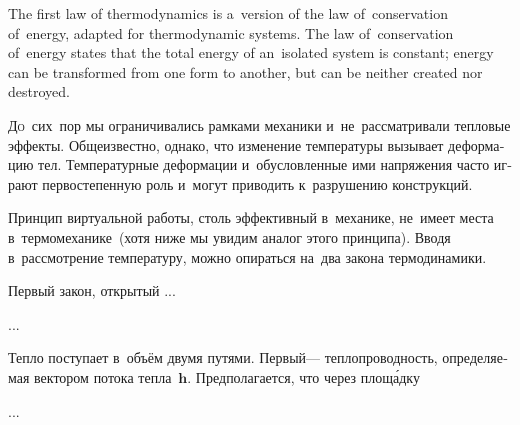 

\thispagestyle{empty}

\label{chapter:thermoelasticity}



\begin{otherlanguage}{russian}

{\small
The first law of thermodynamics is a~version of the law of~conservation of~energy, adapted for thermodynamic systems. The law of~conservation of~energy states that the total energy of an~isolated system is constant; energy can be transformed from one form to another, but can be neither created nor destroyed.
\par}

\lettrine[lines=2, findent=2pt, nindent=0pt]{Д}{о}~сих~пор мы ограничивались рамками механики и~не~рассматривали тепловые эффекты. Общеизвестно, однако, что изменение температуры вызывает деформацию тел. Температурные деформации и~обусловленные ими напряжения часто играют первостепенную роль и~могут приводить к~разрушению конструкций.

Принцип виртуальной работы, столь эффективный в~механике, не~имеет места в~термо\-механике~(хотя ниже мы увидим аналог этого принципа). Вводя в~рассмотрение температуру, можно опираться на~два закона термодинамики.

Первый закон, открытый ...

...

Тепло поступает в~объём двумя путями. Первый\:--- теплопроводность, определяемая вектором потока тепла~$\bm{h}$. Предполагается, что через площ\'{а}дку

...



\end{otherlanguage}

